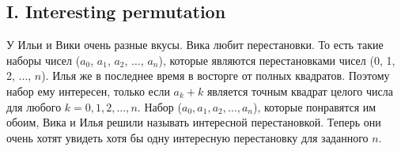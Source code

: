 


\subsection*{I. Interesting permutation}

У Ильи и Вики очень разные вкусы. Вика любит перестановки. То есть такие наборы чисел ($a_0$, $a_1$, $a_2$, $\dots$, $a_n$), которые являются перестановками чисел (0, 1, 2, $\dots$, $n$). Илья же в последнее время в восторге от полных квадратов. Поэтому набор ему интересен, только если $a_k+k$ является точным квадрат целого числа для любого $k = 0, 1, 2, \dots, n$. Набор ($a_0, a_1, a_2, \dots, a_n$), которые понравятся им обоим, Вика и Илья решили называть интересной перестановкой. Теперь они очень хотят увидеть хотя бы одну интересную перестановку для заданного $n$.




